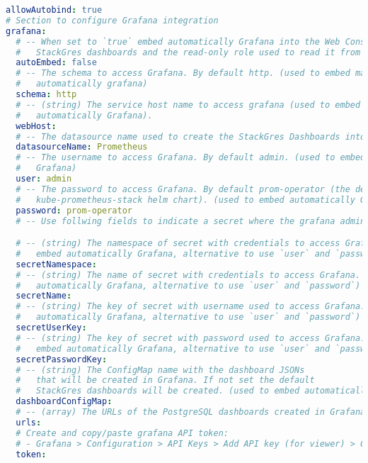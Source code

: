 \begin{lstlisting}[language=yaml, caption=StackGres-Citus - Helm Chart Manifest,captionpos=b,label={lst:stackgres_citus-values.yaml},breaklines=true]
  allowAutobind: true
# Section to configure Grafana integration
grafana:
  # -- When set to `true` embed automatically Grafana into the Web Console by creating the
  #   StackGres dashboards and the read-only role used to read it from the Web Console
  autoEmbed: false
  # -- The schema to access Grafana. By default http. (used to embed manually and
  #   automatically grafana)
  schema: http
  # -- (string) The service host name to access grafana (used to embed manually and
  #   automatically Grafana).
  webHost:
  # -- The datasource name used to create the StackGres Dashboards into Grafana
  datasourceName: Prometheus
  # -- The username to access Grafana. By default admin. (used to embed automatically
  #   Grafana)
  user: admin
  # -- The password to access Grafana. By default prom-operator (the default in for
  #   kube-prometheus-stack helm chart). (used to embed automatically Grafana)
  password: prom-operator
  # -- Use follwing fields to indicate a secret where the grafana admin credentials are stored (replace user/password)

  # -- (string) The namespace of secret with credentials to access Grafana. (used to
  #   embed automatically Grafana, alternative to use `user` and `password`)
  secretNamespace:
  # -- (string) The name of secret with credentials to access Grafana. (used to embed
  #   automatically Grafana, alternative to use `user` and `password`)
  secretName:
  # -- (string) The key of secret with username used to access Grafana. (used to embed
  #   automatically Grafana, alternative to use `user` and `password`)
  secretUserKey:
  # -- (string) The key of secret with password used to access Grafana. (used to
  #   embed automatically Grafana, alternative to use `user` and `password`)
  secretPasswordKey:
  # -- (string) The ConfigMap name with the dashboard JSONs
  #   that will be created in Grafana. If not set the default
  #   StackGres dashboards will be created. (used to embed automatically Grafana)
  dashboardConfigMap:
  # -- (array) The URLs of the PostgreSQL dashboards created in Grafana (used to embed manually
  urls:
  # Create and copy/paste grafana API token:
  # - Grafana > Configuration > API Keys > Add API key (for viewer) > Copy key value
  token:


\end{lstlisting}
